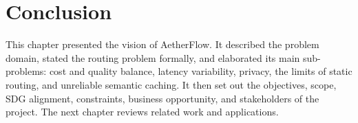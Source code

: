 \section{Conclusion}
\label{sec:ch2-conclusion}

This chapter presented the vision of AetherFlow. It described the problem domain, stated the routing problem formally, and elaborated its main sub-problems: cost and quality balance, latency variability, privacy, the limits of static routing, and unreliable semantic caching. It then set out the objectives, scope, SDG alignment, constraints, business opportunity, and stakeholders of the project. The next chapter reviews related work and applications.


